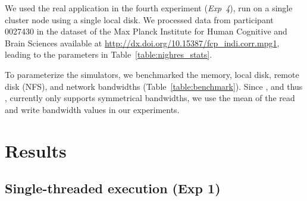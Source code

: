 We used the real application in the fourth experiment
(\textit{Exp~4}), run on a single cluster node 
using a single local disk. We processed data from
participant 0027430 in the dataset of the Max Planck Institute for
Human Cognitive and Brain Sciences available at
\url{http://dx.doi.org/10.15387/fcp_indi.corr.mpg1}, leading to the
parameters in Table~\ref{table:nighres_stats}.


To parameterize the simulators, we benchmarked the
memory, local disk, remote disk (NFS), and network bandwidths
(Table~\ref{table:benchmark}). Since \simgrid, and thus \wrench, currently only supports
symmetrical bandwidths, we use the mean of the read and write
bandwidth values in our experiments.


\section{Results}

\subsection{Single-threaded execution (Exp 1)}

